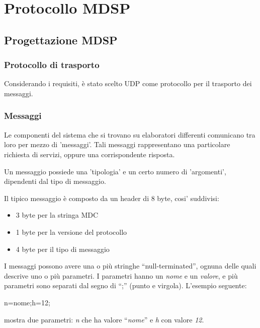 \chapter{Protocollo MDSP}

\section{Progettazione MDSP}

\subsection{Protocollo di trasporto}
Considerando i requisiti, è stato scelto UDP come protocollo per il trasporto
dei messaggi.

\subsection{Messaggi}


Le componenti del sistema che si trovano su elaboratori differenti comunicano tra
loro per mezzo di 'messaggi'. Tali messaggi rappresentano una particolare
richiesta di servizi, oppure una corrispondente risposta.

Un messaggio possiede una 'tipologia' e un certo numero di 'argomenti', dipendenti dal tipo di messaggio.

Il tipico messaggio è composto da un header di 8 byte, cosi' suddivisi:



\begin{itemize}
\item 3 byte per la stringa MDC

\item 1 byte per la versione del protocollo

\item 4 byte per il tipo di messaggio
\end{itemize}

I messaggi possono avere una o più stringhe ``null-terminated'',
ognuna delle quali descrive uno o più parametri. I parametri hanno un
\emph{nome} e un \emph{valore}, e più parametri sono separati dal segno di
``;'' (punto e virgola). L'esempio seguente:

\begin{code}
n=nome;h=12;
\end{code}

mostra due parametri: \emph{n} che ha valore ``\emph{nome}'' e \emph{h} con
valore \emph{12}.

